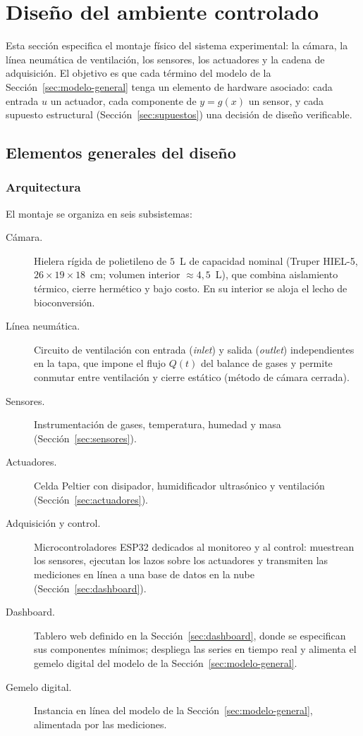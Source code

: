\section{Diseño del ambiente controlado}\label{sec:diseno}

Esta sección especifica el montaje físico del sistema experimental: la cámara,
la línea neumática de ventilación, los sensores, los actuadores y la cadena de
adquisición. El objetivo es que cada término del modelo de la
Sección~\ref{sec:modelo-general} tenga un elemento de hardware asociado: cada
entrada $u$ un actuador, cada componente de $y = g(x)$ un sensor, y cada
supuesto estructural (Sección~\ref{sec:supuestos}) una decisión de diseño
verificable.

\subsection{Elementos generales del diseño}\label{sec:elementos-generales}

\subsubsection{Arquitectura}

El montaje se organiza en seis subsistemas:

\begin{description}
  \item[Cámara.] Hielera rígida de polietileno de $5$~L de capacidad nominal
  (Truper HIEL-5, $26 \times 19 \times 18$~cm; volumen interior
  $\approx 4{,}5$~L), que combina aislamiento térmico, cierre hermético y bajo
  costo. En su interior se aloja el lecho de bioconversión.
  \item[Línea neumática.] Circuito de ventilación con entrada (\emph{inlet}) y
  salida (\emph{outlet}) independientes en la tapa, que impone el flujo $Q(t)$
  del balance de gases y permite conmutar entre ventilación y cierre estático
  (método de cámara cerrada).
  \item[Sensores.] Instrumentación de gases, temperatura, humedad y masa
  (Sección~\ref{sec:sensores}).
  \item[Actuadores.] Celda Peltier con disipador, humidificador ultrasónico y
  ventilación (Sección~\ref{sec:actuadores}).
    \item[Adquisición y control.] Microcontroladores ESP32 dedicados al
  monitoreo y al control: muestrean los sensores, ejecutan los lazos sobre
  los actuadores y transmiten las mediciones en línea a una base de datos
  en la nube (Sección~\ref{sec:dashboard}).
  \item[Dashboard.] Tablero web definido en la Sección~\ref{sec:dashboard},
  donde se especifican sus componentes mínimos; despliega las series en
  tiempo real y alimenta el gemelo digital del modelo de la
  Sección~\ref{sec:modelo-general}.  
  \item[Gemelo digital.] Instancia en línea del modelo de la
  Sección~\ref{sec:modelo-general}, alimentada por las mediciones.
\end{description}

